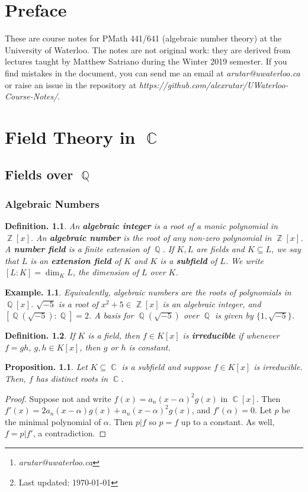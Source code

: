\documentclass[11pt, a4paper]{memoir}
\title{\subject}
\author{Alex Rutar\thanks{\itshape arutar@uwaterloo.ca}\\\textit{University of Waterloo}}
\date{\semester\thanks{Last updated: \today}}
\DeclareMathOperator{\Q}{{\mathbb{Q}}}
\DeclareMathOperator{\Z}{{\mathbb{Z}}}
\DeclareMathOperator{\C}{{\mathbb{C}}}
\theoremstyle{change}
\newtheorem{proposition}[theorem]{Proposition.}
\theoremstyle{plain}
\theoremstyle{nonumberplain}
\newtheorem{definition}{Definition.}
\newtheorem{example}{Example.}
\newtheorem{proof}{Proof}
\newcommand{\mbf}[1]{{\boldmath\bfseries #1}}
\numberwithin{equation}{section}
\begin{document}
\hypersetup{pageanchor=false}
\maketitle
\newpage
\frontmatter
\hypersetup{pageanchor=true}
\tableofcontents*
\newpage


\chapter*{Preface}
These are course notes for PMath 441/641 (algebraic number theory) at the University of Waterloo.
The notes are not original work: they are derived from lectures taught by Matthew Satriano during the Winter 2019 semester.
If you find mistakes in the document, you can send me an email at \textit{arutar@uwaterloo.ca} or raise an issue in the repository at \textit{https://github.com/alexrutar/UWaterloo-Course-Notes/}.
\mainmatter
\chapter{Field Theory in \texorpdfstring{$\C$}{C}}
\section{Fields over \texorpdfstring{$\Q$}{Q}}
\subsection{Algebraic Numbers}
\begin{definition}
    An \mbf{algebraic integer} is a root of a monic polynomial in $\Z[x]$.
    An \mbf{algebraic number} is the root of any non-zero polynomial in $\Z[x]$.
    A \mbf{number field} is a finite extension of $\Q$.
    If $K,L$ are fields and $K\subseteq L$, we say that $L$ is an \mbf{extension field} of $K$ and $K$ is a \mbf{subfield} of $L$.
    We write $[L:K]=\dim_KL$, the dimension of $L$ over $K$.
\end{definition}
\begin{example}
    Equivalently, algebraic numbers are the roots of polynomials in $\Q[x]$.
    $\sqrt{-5}$ is a root of $x^2+5\in\Z[x]$ is an algebraic integer, and $[\Q(\sqrt{-5}):\Q]=2$.
    A basis for $\Q(\sqrt{-5})$ over $\Q$ is given by $\{1,\sqrt{-5}\}$.
\end{example}
\begin{definition}
    If $K$ is a field, then $f\in K[x]$ is \mbf{irreducible} if whenever $f=gh$, $g,h\in K[x]$, then $g$ or $h$ is constant.
\end{definition}
\begin{proposition}
    Let $K\subseteq\C$ is a subfield and suppose $f\in K[x]$ is irreducible.
    Then, $f$ has distinct roots in $\C$.
\end{proposition}
\begin{proof}
    Suppose not and write $f(x)=a_n(x-\alpha)^2g(x)$ in $\C[x]$.
    Then $f'(x)=2a_n(x-\alpha)g(x)+a_n(x-\alpha)^2g(x)$, and $f'(\alpha)=0$.
    Let $p$ be the minimal polynomial of $\alpha$.
    Then $p|f$ so $p=f$ up to a constant.
    As well, $f=p|f'$, a contradiction.
\end{proof}
\end{document}
